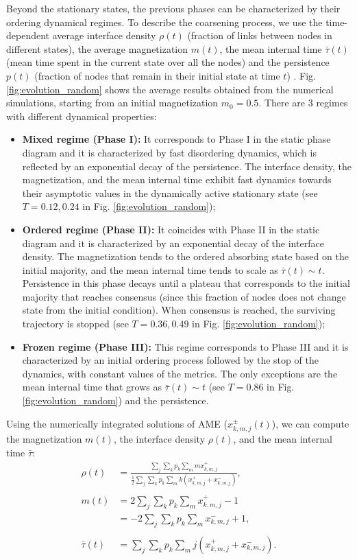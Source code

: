 Beyond the stationary states, the previous phases can be characterized by their ordering dynamical regimes. To describe the coarsening process, we use the time-dependent average interface density $\rho(t)$ (fraction of links between nodes in different states), the average magnetization $m(t)$, the mean internal time $\bar{\tau}(t)$ (mean time spent in the current state over all the nodes) and the persistence $p(t)$ (fraction of nodes that remain in their initial state at time $t$) \cite{ben-naim-1996}. Fig. \ref{fig:evolution_random} shows the average results obtained from the numerical simulations, starting from an initial magnetization $m_0 = 0.5$. There are 3 regimes with different dynamical properties:
\begin{itemize}
	\item \textbf{Mixed regime (Phase I):} It corresponds to Phase I in the static phase diagram and it is characterized by fast disordering dynamics, which is reflected by an exponential decay of the persistence. The interface density, the magnetization, and the mean internal time exhibit fast dynamics towards their asymptotic values in the dynamically active stationary state (see $T = 0.12, 0.24$ in Fig. \ref{fig:evolution_random});
	\item \textbf{Ordered regime (Phase II):} It coincides with Phase II in the static diagram and it is characterized by an exponential decay of the interface density. The magnetization tends to the ordered absorbing state based on the initial majority, and the mean internal time tends to scale as $\bar{\tau}(t) \sim t$. Persistence in this phase decays until a plateau that corresponds to the initial majority that reaches consensus (since this fraction of nodes does not change state from the initial condition). When consensus is reached, the surviving trajectory is stopped (see $T = 0.36, 0.49$ in Fig. \ref{fig:evolution_random});
	\item \textbf{Frozen regime (Phase III):} This regime corresponds to Phase III and it is characterized by an initial ordering process followed by the stop of the dynamics, with constant values of the metrics. The only exceptions are the mean internal time that grows as $\bar{\tau}(t) \sim t$ (see $T = 0.86$ in Fig. \ref{fig:evolution_random}) and the persistence.
\end{itemize}
Using the numerically integrated solutions of AME ($x^{\pm}_{k,m,j}(t)$), we can compute the magnetization $m(t)$, the interface density $\rho(t)$, and the mean internal time $\bar{\tau}$:
\begin{eqnarray}
	\rho(t) &=  \frac{\sum_j \sum_k p_k \sum_m  m x^{+}_{k,m,j}}{\frac{1}{2} \sum_j \sum_k p_k \sum_m  k (x^{+}_{k,m,j} + x^{-}_{k,m,j})},\label{eq:interface}\\
	\nonumber\\
	m(t) &=  2 \sum_j \sum_k p_k \sum_m x^{+}_{k,m,j} - 1 \nonumber\\
	&= - 2 \sum_j \sum_k p_k \sum_m x^{-}_{k,m,j} + 1,\label{eq:magne}\\
	\nonumber\\
	\bar{\tau} (t) &=  \sum_j \sum_k p_k \sum_m j \left(x^{+}_{k,m,j} + x^{-}_{k,m,j}\right).\label{eq:time}
\end{eqnarray}
